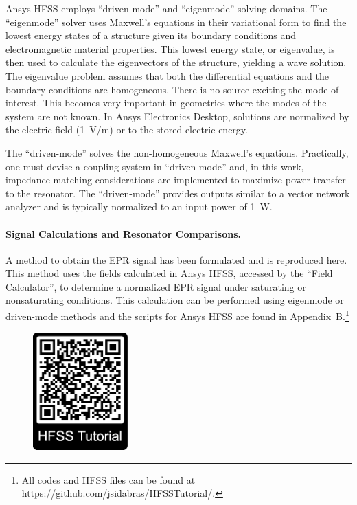 Ansys HFSS employs ``driven-mode'' and ``eigenmode'' solving domains. The ``eigenmode'' solver uses Maxwell's equations in their variational form to find the lowest energy states of a structure given its boundary conditions and electromagnetic material properties. \cite{sadiku2000numerical,jin2015finite} This lowest energy state, or eigenvalue, is then used to calculate the eigenvectors of the structure, yielding a wave solution. The eigenvalue problem assumes that both the differential equations and the boundary conditions are homogeneous. There is no source exciting the mode of interest. This becomes very important in geometries where the modes of the system are not known. In Ansys Electronics Desktop, solutions are normalized by the electric field (1~V/m) or to the stored electric energy.

The ``driven-mode'' solves the non-homogeneous Maxwell's equations. Practically, one must devise a coupling system in ``driven-mode'' and, in this work, impedance matching considerations are implemented to maximize power transfer to the resonator. The ``driven-mode'' provides outputs similar to a vector network analyzer and is typically normalized to an input power of 1~W. 

\paragraph*{Signal Calculations and Resonator Comparisons.}
A method to obtain the EPR signal has been formulated and is reproduced here. \cite{misrabook} This method uses the fields calculated in Ansys HFSS, accessed by the ``Field Calculator'', to determine a normalized EPR signal under saturating or nonsaturating conditions. This calculation can be performed using eigenmode or driven-mode methods and the scripts for Ansys HFSS are found in Appendix~B.\footnote{All codes and HFSS files can be found at https://github.com/jsidabras/HFSSTutorial/.} 

\begin{figure}
\centering
\includegraphics[width=3.65cm]{Kapitel/Appendix/HFSSTutQR.eps}
\end{figure}

